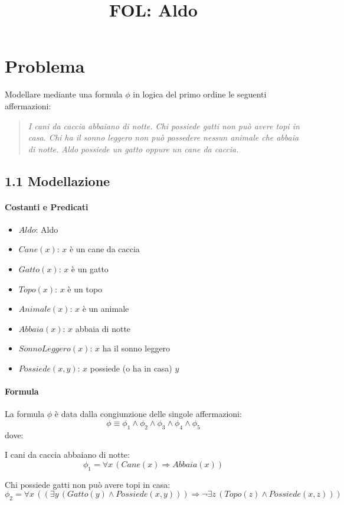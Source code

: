\documentclass[a4paper,11pt]{article}
\title{FOL: Aldo}
\date{}
\begin{document}
\maketitle

\section*{Problema}
Modellare mediante una formula $\phi$ in logica del primo ordine le seguenti affermazioni:
\begin{quote}
\textit{I cani da caccia abbaiano di notte. Chi possiede gatti non può avere topi in casa.
Chi ha il sonno leggero non può possedere nessun animale che abbaia di notte.
Aldo possiede un gatto oppure un cane da caccia.}
\end{quote}

\subsection*{1.1 Modellazione}

\paragraph{Costanti e Predicati}
\begin{itemize}
  \item $Aldo$: Aldo
  \item $Cane(x)$: $x$ è un cane da caccia
  \item $Gatto(x)$: $x$ è un gatto
  \item $Topo(x)$: $x$ è un topo
  \item $Animale(x)$: $x$ è un animale
  \item $Abbaia(x)$: $x$ abbaia di notte
  \item $SonnoLeggero(x)$: $x$ ha il sonno leggero
  \item $Possiede(x, y)$: $x$ possiede (o ha in casa) $y$
\end{itemize}

\paragraph{Formula}
La formula $\phi$ è data dalla congiunzione delle singole affermazioni:
\[
\phi \equiv \phi_1 \land \phi_2 \land \phi_3 \land \phi_4 \land \phi_5
\]
dove:
    
I cani da caccia abbaiano di notte:
\[\phi_1 = \forall x \, (Cane(x) \Rightarrow Abbaia(x))\]

Chi possiede gatti non può avere topi in casa:
\[\phi_2 = \forall x \, ((\exists y \, (Gatto(y) \land Possiede(x, y))) \Rightarrow \neg \exists z \, (Topo(z) \land Possiede(x, z)))\]
\end{document}
